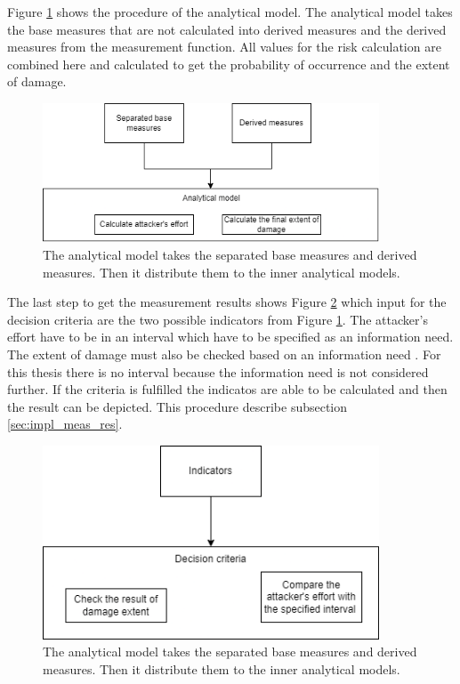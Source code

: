 Figure \ref{fig:impl_ana_mod} shows the procedure of the analytical model. The analytical model takes the base measures that are not calculated into derived measures and the derived measures from the measurement function. All values for the risk calculation are combined here and calculated to get the probability of occurrence and the extent of damage.

\begin{figure}[ht!]
  \centering
  \includegraphics[width=10cm]{pictures/impl_ana_mod.png}
  \caption{The analytical model takes the separated base measures and derived measures. Then it distribute them to the inner analytical models.}
  \label{fig:impl_ana_mod}
\end{figure}

The last step to get the measurement results shows Figure \ref{fig:impl_dec_criteria} which input for the decision criteria are the two possible indicators from Figure \ref{fig:impl_ana_mod}. The attacker's effort have to be in an interval which have to be specified as an information need. The extent of damage must also be checked based on an information need \cite{ISO_27004_2009}. For this thesis there is no interval because the information need is not considered further. If the criteria is fulfilled the indicatos are able to be calculated and then the result can be depicted. This procedure describe subsection \ref{sec:impl_meas_res}.

\begin{figure}[ht!]
  \centering
  \includegraphics[width=10cm]{pictures/impl_dec_criteria.png}
  \caption{The analytical model takes the separated base measures and derived measures. Then it distribute them to the inner analytical models.}
  \label{fig:impl_dec_criteria}
\end{figure}

